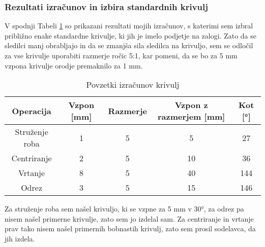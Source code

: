 \subsubsection{Rezultati izračunov in izbira standardnih krivulj}
V spodnji Tabeli \ref{Tabela rezultatov} so prikazani
rezultati mojih izračunov, s katerimi sem izbral približno
enake standardne krivulje, ki jih je imelo podjetje na zalogi.
Zato da se sledilci manj obrabljajo in da se zmanjša sila sledilca
na krivuljo, sem se odločil za vse krivulje uporabiti razmerje ročic
5:1, kar pomeni, da se bo za 5 mm vzpona krivulje orodje premaknilo za 1 mm.

\begin{table}[H]
	\caption{Povzetki izračunov krivulj}
	\label{Tabela rezultatov}
	\begin{center}
		\begin{tabular}{|c|c|c|c|c|}
			\hline
			Operacija      & Vzpon [mm] & Razmerje & Vzpon z razmerjem [mm] & Kot [°] \\
			\hline
			Struženje roba & 1          & 5        & 5                      & 27      \\
			\hline
			Centriranje    & 2          & 5        & 10                     & 36      \\
			\hline
			Vrtanje        & 8          & 5        & 40                     & 144     \\
			\hline
			Odrez          & 3          & 5        & 15                     & 146     \\
			\hline
		\end{tabular}
	\end{center}
\end{table}

Za struženje roba sem našel krivuljo, ki se vzpne za 5 mm v 30°,
za odrez pa nisem našel primerne krivulje, zato sem jo izdelal sam.
Za centriranje in vrtanje prav tako nisem našel primernih bobnastih krivulj,
zato sem prosil sodelavca, da jih izdela.